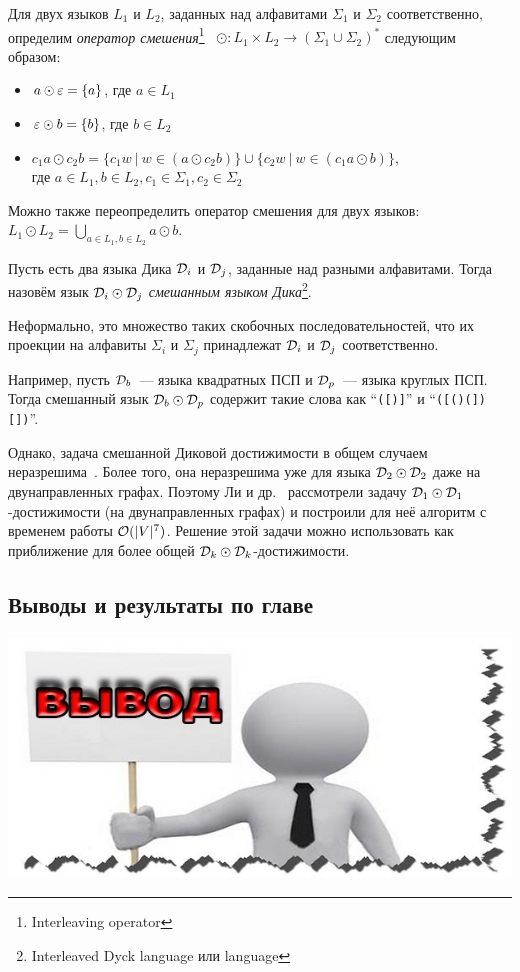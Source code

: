 \begin{definition}
  Для двух языков $L_1$ и $L_2$, заданных над алфавитами $\Sigma_1$ и $\Sigma_2$ соответственно, определим \textit{оператор смешения}\footnote{Interleaving operator}~\cite{Li21} $\odot: L_1 \times L_2 \to (\Sigma_1 \cup \Sigma_2)^{*}$ следующим образом:
  \vspace{-\topsep}
  \begin{itemize}
    \setlength\itemsep{-0.1em}
    \item $a \odot \varepsilon = \{ a \}$, где $a \in L_1$
    \item $\varepsilon \odot b = \{ b \}$, где $b \in L_2$
    \item $c_1 a \odot c_2 b = \{ c_1 w~|~w \in (a \odot c_2 b) \} \cup \{ c_2 w~|~w \in (c_1 a \odot b) \}$,\\ где $a \in L_1, b \in L_2, c_1 \in \Sigma_1, c_2 \in \Sigma_2$
  \end{itemize}

  Можно также переопределить оператор смешения для двух языков:\\ $L_1 \odot L_2 = \bigcup\limits_{a \in L_1, b \in L_2} a \odot b$.
\end{definition}

\begin{definition}
  Пусть есть два языка Дика $\mathcal{D}_i$ и $\mathcal{D}_j$, заданные над разными алфавитами. Тогда назовём язык $\mathcal{D}_i \odot \mathcal{D}_j$ \textit{смешанным языком Дика}\footnote{Interleaved Dyck language или  language}.

  Неформально, это множество таких скобочных последовательностей, что их проекции на алфавиты $\Sigma_i$ и $\Sigma_j$ принадлежат $\mathcal{D}_i$ и $\mathcal{D}_j$ соответственно.

  Например, пусть $\mathcal{D}_b$~--- языка квадратных ПСП и $\mathcal{D}_p$~--- языка круглых ПСП. Тогда смешанный язык $\mathcal{D}_b \odot \mathcal{D}_p$ содержит такие слова как ``\texttt{([)]}'' и ``\texttt{([()(])[])}''.
\end{definition}

Однако, задача смешанной Диковой достижимости в общем случаем неразрешима~\cite{Reps00}. Более того, она неразрешима уже для языка $\mathcal{D}_2 \odot \mathcal{D}_2$ даже на двунаправленных графах. Поэтому Ли и др.~\cite{Li21} рассмотрели задачу $\mathcal{D}_1 \odot \mathcal{D}_1$-достижимости (на двунаправленных графах) и построили для неё алгоритм с временем работы $\mathcal{O}(|V|^7)$. Решение этой задачи можно использовать как приближение для более общей $\mathcal{D}_k \odot \mathcal{D}_k$-достижимости.

\subsection{Выводы и результаты по главе}

\TODO

\includegraphics[width=0.75\linewidth]{img/conclusion}
